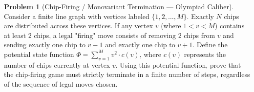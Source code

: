 \documentclass[11pt, a4paper]{article}
\theoremstyle{definition}
\newtheorem{problem}{Problem}
\theoremstyle{plain}
\begin{document}
\vspace{0.5cm}

\begin{problem}[Chip-Firing / Monovariant Termination --- Olympiad Caliber]
Consider a finite line graph with vertices labeled $\{1, 2, \dots, M\}$. Exactly $N$ chips are distributed across these vertices. If any vertex $v$ (where $1 < v < M$) contains at least $2$ chips, a legal "firing" move consists of removing $2$ chips from $v$ and sending exactly one chip to $v - 1$ and exactly one chip to $v + 1$.
Define the potential state function $\Phi = \sum_{v=1}^M v^2 \cdot c(v)$, where $c(v)$ represents the number of chips currently at vertex $v$. 
Using this potential function, prove that the chip-firing game must strictly terminate in a finite number of steps, regardless of the sequence of legal moves chosen.
\end{problem}
\end{document}
